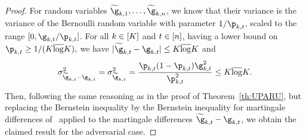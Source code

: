 \begin{proof}
	For random variables $\estGainVector_{k,1}, \ldots, 
	\estGainVector_{k,n}$, we know that their variance is 
	the variance of the Bernoulli random variable with 
	parameter $1/\learnerDist_{k,t}$, scaled to the range $[0, \gainVector_{k,t}/\learnerDist_{k,t}]$.
	For all $k\in[K]$ and $t\in[n]$, 
	having a lower bound on $\learnerDist_{k,t}\geq 1/(\nArms\bar\log\nArms),$ 
	we have 
	$|\estGainVector_{k,t}-\gainVector_{k,t}| \leq  \nArms\bar\log\nArms$ 
	and  \[\var_{\estGainVector_{k,t}-\gainVector_{k,t}}
	=
	\var_{\estGainVector_{k,t}}=\frac{\learnerDist_{k,t}
	(1-\learnerDist_{k,t})\gainVector_{k,t}^2}{\learnerDist^2_{k,t}}\leq \nArms\bar\log \nArms.\]
	Then, following the same reasoning as in the proof 
	of Theorem~\ref{th:UPARU}, but replacing the Bernstein inequality by the Bernstein inequality for martingale differences of~\cite{Freedman75OT} applied to the martingale 
	differences $\estGainVector_{k,t}-\gainVector_{k,t}$,  
	we obtain the claimed result for the adversarial case.
\end{proof}
%
